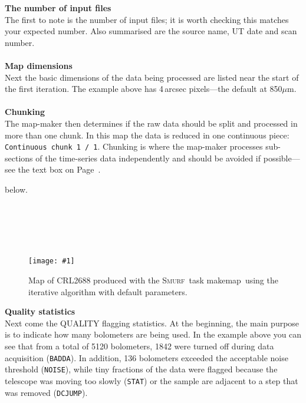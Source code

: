 \documentclass[twoside,11pt]{article}
\newcommand{\htmladdimg}[1]{}
\newenvironment{latexonly}{}{}
\newcommand{\xref}[3]{#1}
\renewcommand{\_}{\texttt{\symbol{95}}}
\newcommand{\smurf}{\xref{\textsc{Smurf}}{sun258}{}}
\newcommand{\task}[1]{\textsf{#1}}
\newcommand{\param}[1]{\texttt{#1}}
\newcommand{\makemap}{\xref{\task{makemap}}{sun258}{MAKEMAP}}
\newcommand{\myfig}[6]{
  \begin{figure}#2
    \centering\texttt{[image: \#1]}
    \typeout{#1 inserted on page \arabic{page}}
    \caption[#5]{\label{#4}\small #6}
  \end{figure}
}
\newcommand{\myfig}[6]{
    \label{#4} \htmladdimg{#1.png}\\
    \\
    Figure: #6\\
  }
\begin{document}
\textbf{The number of input files}\\
The first to note is the number of input files; it is worth checking
this matches your expected number. Also summarised are the source
name, UT date and scan number.
\\ \\
\textbf{Map dimensions}\\
Next the basic dimensions of the data being processed are listed near
the start of the first iteration. The example above has 4\,arcsec
pixels---the default at 850$\mu$m.
\\ \\
\textbf{Chunking}\\
\label{box:chunk}
The map-maker then determines if the raw data should be split and
processed in more than one chunk. In this map the data is reduced in
one continuous piece: \param{Continuous chunk 1 / 1}. Chunking is
where the map-maker processes sub-sections of the time-series data
independently and should be avoided if possible---see the text box
\begin{latexonly}
on Page~\pageref{page:text}.
\end{latexonly}
\begin{htmlonly}
below.
\end{htmlonly}
\\

\begin{htmlonly}
\htmladdimg{sc21_data_chunking.png}
\\ \\
\end{htmlonly}

\myfig{sc21_crl2688}{[t!]}{width=0.7\linewidth}{fig:itermap}{
  CRL2688 produced with \makemap}{
  Map of CRL2688 produced with the \smurf\ task \makemap\ using the
  iterative algorithm with default parameters.
}

\textbf{Quality statistics}\\
Next come the QUALITY flagging statistics. At the beginning, the main
purpose is to indicate how many bolometers are being used. In the
example above you can see that from a total of 5120 bolometers, 1842
were turned off during data acquisition (\texttt{BADDA}). In addition,
136 bolometers exceeded the acceptable noise threshold
(\texttt{NOISE}), while tiny fractions of the data were flagged
because the telescope was moving too slowly (\texttt{STAT}) or the
sample are adjacent to a step that was removed (\texttt{DCJUMP}).
\end{document}
